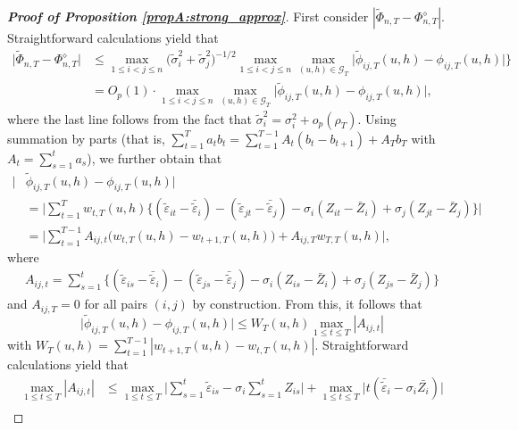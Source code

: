 \documentclass[12pt]{article}
\begin{document}
\begin{proof}[\textnormal{\textbf{Proof of Proposition \ref{propA:strong_approx}}}]
First consider $|\widetilde{\Phi}_{n, T} - \Phi_{n, T}^{\diamond}|$. Straightforward calculations yield that 
\begin{align}
\big| \widetilde{\Phi}_{n, T} - \Phi_{n, T}^{\diamond} \big| 
 & \le \max_{1\le i < j \le n} \big(\widetilde{\sigma}_i^2 + \widetilde{\sigma}_j^2 \big)^{-1/2} \max_{1\le i < j \le n} \max_{(u,h) \in \mathcal{G}_T} \big| \widetilde{\phi}_{ij, T}(u,h) - \phi_{ij, T}(u,h) \big|\Big\}  \nonumber \\ 
 & = O_p(1) \cdot \max_{1\le i < j \le n} \max_{(u,h) \in \mathcal{G}_T} \big| \widetilde{\phi}_{ij, T}(u,h) - \phi_{ij, T}(u,h) \big|, \label{eqA:strong_approx:bound2}
\end{align}
where the last line follows from the fact that $\widetilde{\sigma}_i^2 = \sigma_i^2 + o_p(\rho_T)$. Using summation by parts (that is, $\sum_{t=1}^T a_t b_t = \sum_{t=1}^{T-1} A_t (b_t - b_{t+1}) + A_T b_T$ with $A_t = \sum_{s=1}^t a_s$), we further obtain that 
\begin{align*}
\big| & \widetilde{\phi}_{ij, T}(u,h) - \phi_{ij, T}(u,h) \big|  \\
 & =\bigg|\sum_{t=1}^T w_{t,T}(u,h) \big\{ (\widetilde{\varepsilon}_{it} - \bar{\widetilde{\varepsilon}}_i) - (\widetilde{\varepsilon}_{jt} - \bar{\widetilde{\varepsilon}}_j) -{\sigma}_i (Z_{it} - \bar{Z}_i) + {\sigma}_j (Z_{jt} - \bar{Z}_j) \big\}\bigg|  \\
 & =\Big|\sum_{t=1}^{T-1} A_{ij, t} \big(w_{t,T}(u,h) -w_{t+1,T}(u,h)\big) + A_{ij, T} w_{T,T}(u,h)\Big|,
\end{align*}
where 
\begin{align*}
A_{ij, t} = \sum_{s=1}^t \big\{ (\widetilde{\varepsilon}_{is} - \bar{\widetilde{\varepsilon}}_i)  - (\widetilde{\varepsilon}_{js} - \bar{\widetilde{\varepsilon}}_j) -{\sigma}_i (Z_{is} - \bar{Z}_i) + {\sigma}_j (Z_{js} - \bar{Z}_j) \big\}
\end{align*}
and $A_{ij, T} = 0$ for all pairs $(i, j)$ by construction. From this, it follows that 
\begin{equation}\label{eq-strongapprox-bound3}
\big| \widetilde{\phi}_{ij, T}(u,h) - \phi_{ij, T}(u,h) \big| \le W_T(u, h) \max_{1 \le t \le T} |A_{ij, t}|
\end{equation}
with $W_T(u,h) = \sum_{t=1}^{T-1} |w_{t+1,T}(u,h) - w_{t,T}(u,h)|$. Straightforward calculations yield that
\begin{align*}
\max_{1 \le t \le T} |A_{ij, t}| 
 & \le \max_{1 \le t \le T} \Big| \sum\limits_{s=1}^t \widetilde{\varepsilon}_{is} -{\sigma}_i \sum\limits_{s=1}^t Z_{is} \Big| + \max_{1 \le t \le T} \Big| t (\bar{\widetilde{\varepsilon}}_{i} - {\sigma}_i \bar{Z_i}) \Big|\\

\end{align*}
\end{proof}
\end{document}
